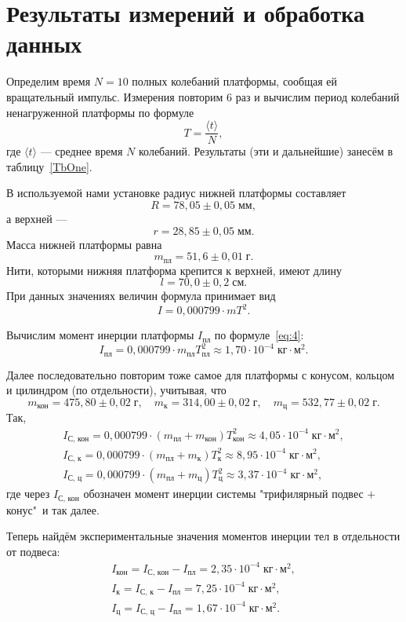 \section{Результаты измерений и обработка данных}

Определим время $N=10$ полных колебаний платформы, сообщая ей вращательный импульс. Измерения повторим 6 раз и вычислим период колебаний ненагруженной платформы по формуле
\[
T=\frac{\langle t\rangle}{N},
\]
где $\langle t\rangle$ --- среднее время $N$ колебаний. Результаты (эти и дальнейшие) занесём в таблицу~\ref{TbOne}.

В используемой нами установке радиус нижней платформы составляет
\[
R=78{,}05\pm0{,}05\;\text{мм},
\]
а верхней ---
\[
r=28{,}85\pm0{,}05\;\text{мм}.
\]
Масса нижней платформы равна
\[
m_\text{пл}=51{,}6\pm0{,}01\;\text{г}.
\]
Нити, которыми нижняя платформа крепится к верхней, имеют длину
\[
l=70{,}0\pm0{,}2\;\text{см}.
\]
При данных значениях величин формула принимает вид
\[
I=0{,}000799\cdot mT^2.
\]

Вычислим момент инерции платформы $I_\text{пл}$ по формуле~\eqref{eq:4}:
\[
I_\text{пл}=0{,}000799\cdot m_\text{пл}T_\text{пл}^2\approx1{,}70\cdot10^{-4}\;\text{кг$\cdot$м$^2$}.
\]

Далее последовательно повторим тоже самое для платформы с конусом, кольцом и цилиндром (по отдельности), учитывая, что
\[
m_\text{кон}=475{,}80\pm0{,}02\;\text{г},\quad m_\text{к}=314{,}00\pm0{,}02\;\text{г},\quad m_\text{ц}=532{,}77\pm0{,}02\;\text{г}.
\]
Так,
\begin{gather*}
I_\text{С, кон}=0{,}000799\cdot(m_\text{пл}+m_\text{кон})T_\text{кон}^2\approx4{,}05\cdot10^{-4}\;\text{кг$\cdot$м$^2$}, \\
I_\text{С, к}=0{,}000799\cdot(m_\text{пл}+m_\text{к})T_\text{к}^2\approx8{,}95\cdot10^{-4}\;\text{кг$\cdot$м$^2$}, \\
I_\text{С, ц}=0{,}000799\cdot(m_\text{пл}+m_\text{ц})T_\text{ц}^2\approx3{,}37\cdot10^{-4}\;\text{кг$\cdot$м$^2$},
\end{gather*}
где через $I_\text{С, кон}$ обозначен момент инерции системы "трифилярный подвес $+$ конус"\ и так далее.

Теперь найдём экспериментальные значения моментов инерции тел в отдельности от подвеса:
\begin{gather*}
I_\text{кон}=I_\text{С, кон}-I_\text{пл}=2{,}35\cdot10^{-4}\;\text{кг$\cdot$м$^2$}, \\
I_\text{к}=I_\text{С, к}-I_\text{пл}=7{,}25\cdot10^{-4}\;\text{кг$\cdot$м$^2$}, \\
I_\text{ц}=I_\text{С, ц}-I_\text{пл}=1{,}67\cdot10^{-4}\;\text{кг$\cdot$м$^2$}.
\end{gather*}

